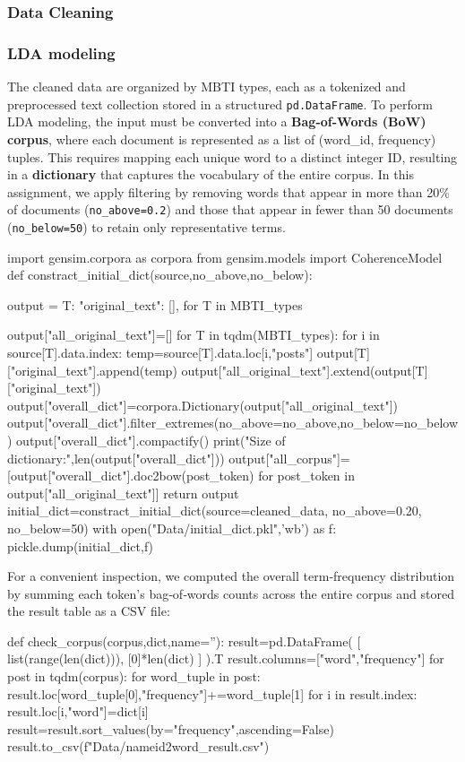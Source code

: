 \documentclass[12pt]{article}
\numberwithin{figure}{section}  %
\begin{document}
\subsubsection{Data Cleaning}
\subsubsection{LDA modeling}
	The cleaned data are organized by MBTI types, each as a tokenized and
	preprocessed text collection stored in a structured \texttt{pd.DataFrame}. 
	To perform LDA modeling, the input must be converted into a
	\textbf{Bag-of-Words (BoW) corpus}, where each document is represented as a
	list of (word\_id, frequency) tuples. This requires mapping each unique word
	to a distinct integer ID, resulting in a \textbf{dictionary} that captures
	the vocabulary of the entire corpus. In this assignment, we apply filtering
	by removing words that appear in more than 20\% of documents
	(\texttt{no\_above=0.2}) and those that appear in fewer than 50 documents
	(\texttt{no\_below=50}) to retain only representative terms.
	\begin{python}
import gensim.corpora as corpora
from gensim.models import CoherenceModel
def constract_initial_dict(source,no_above,no_below):

    output = {T: {
        "original_text": [],
    } for T in MBTI_types}
    
    output["all_original_text"]=[]
    for T in tqdm(MBTI_types):
        for i in source[T].data.index:
            temp=source[T].data.loc[i,"posts"]
            output[T]["original_text"].append(temp)
        output["all_original_text"].extend(output[T]["original_text"])
    output["overall_dict"]=corpora.Dictionary(output["all_original_text"])
    output["overall_dict"].filter_extremes(no_above=no_above,no_below=no_below)
    output["overall_dict"].compactify()
    print("Size of dictionary:",len(output["overall_dict"]))
    output["all_corpus"]=[output["overall_dict"].doc2bow(post_token) for post_token in output["all_original_text"]]
    return output
initial_dict=constract_initial_dict(source=cleaned_data,
                                    no_above=0.20,
                                    no_below=50)
with open("Data/initial_dict.pkl",'wb') as f:
    pickle.dump(initial_dict,f)
	\end{python}
	
	For a convenient inspection, we computed the overall term‐frequency
	distribution by summing each token’s bag‐of‐words counts across the entire
	corpus and stored the result table as a CSV file:
	\begin{python}
def check_corpus(corpus,dict,name=''):
    result=pd.DataFrame(
        [
            list(range(len(dict))),
            [0]*len(dict)
        ]
    ).T
    result.columns=["word","frequency"]
    for post in tqdm(corpus):
        for word_tuple in post:
            result.loc[word_tuple[0],"frequency"]+=word_tuple[1]
    for i in result.index:
        result.loc[i,"word"]=dict[i]
    result=result.sort_values(by="frequency",ascending=False)
    result.to_csv(f"Data/{name}id2word_result.csv")
	\end{python}
	
\end{document}
